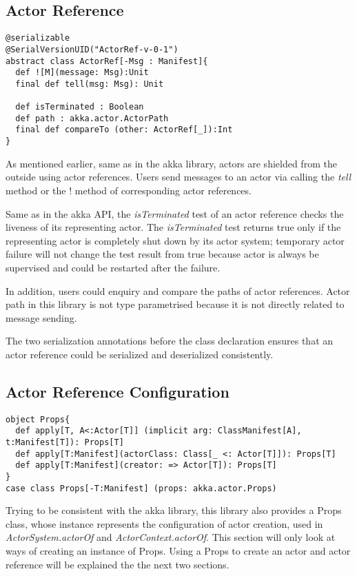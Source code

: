 \subsection{Actor Reference}
\label{sec_actor_ref}
\begin{lstlisting}
@serializable
@SerialVersionUID("ActorRef-v-0-1")
abstract class ActorRef[-Msg : Manifest]{
  def ![M](message: Msg):Unit
  final def tell(msg: Msg): Unit

  def isTerminated : Boolean
  def path : akka.actor.ActorPath
  final def compareTo (other: ActorRef[_]):Int
}
\end{lstlisting}

As mentioned earlier, same as in the akka library, actors are shielded from the outside using actor references.  Users send messages to an actor via calling the \textit{tell} method or the ! method of corresponding actor references.

Same as in the akka API, the \textit{isTerminated} test of an actor reference checks the liveness of its representing actor.  The \textit{isTerminated} test returns true only if the representing actor is completely shut down by its actor system; temporary actor failure will not change the test result from true because actor is always be supervised and could be restarted after the failure.

In addition, users could enquiry and compare the paths of actor references.  Actor path in this library is not type parametrised because it is not directly related to message sending.

The two serialization annotations before the class declaration ensures that an actor reference could be serialized and deserialized consistently.

\subsection{Actor Reference Configuration}
\label{props}

\begin{lstlisting}
object Props{
  def apply[T, A<:Actor[T]] (implicit arg: ClassManifest[A], t:Manifest[T]): Props[T]
  def apply[T:Manifest](actorClass: Class[_ <: Actor[T]]): Props[T]
  def apply[T:Manifest](creator: => Actor[T]): Props[T]
}
case class Props[-T:Manifest] (props: akka.actor.Props)
\end{lstlisting}

Trying to be consistent with the akka library, this library also provides a Props class, whose instance represents the configuration of actor creation, used in \textit{ActorSystem.actorOf} and \textit{ActorContext.actorOf}.  This section will only look at ways of creating an instance of Props.  Using a Props to create an actor and actor reference will be explained the the next two sections.

